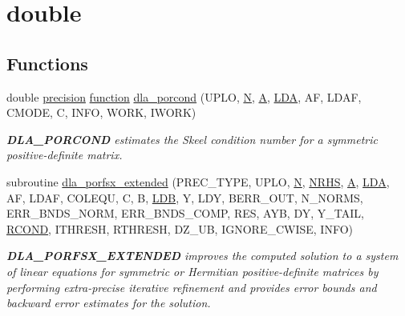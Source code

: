 \hypertarget{group__doublePOcomputational}{}\section{double}
\label{group__doublePOcomputational}
\subsection*{Functions}
\begin{DoxyCompactItemize}
\item 
double \hyperlink{numinquire_8h_a2c8e616467665d0b2814d4c1589ba74e}{precision} \hyperlink{afunc_8m_a7b5e596df91eadea6c537c0825e894a7}{function} \hyperlink{group__doublePOcomputational_gaea66202c968583fe8b93e6259b86f7ac}{dla\+\_\+porcond} (U\+P\+L\+O, \hyperlink{polmisc_8c_a0240ac851181b84ac374872dc5434ee4}{N}, \hyperlink{classA}{A}, \hyperlink{example__user_8c_ae946da542ce0db94dced19b2ecefd1aa}{L\+D\+A}, A\+F, L\+D\+A\+F, C\+M\+O\+D\+E, C, I\+N\+F\+O, W\+O\+R\+K, I\+W\+O\+R\+K)
\begin{DoxyCompactList}\small\item\em {\bfseries D\+L\+A\+\_\+\+P\+O\+R\+C\+O\+N\+D} estimates the Skeel condition number for a symmetric positive-\/definite matrix. \end{DoxyCompactList}\item 
subroutine \hyperlink{group__doublePOcomputational_ga1f04f8900d0a841afb32c0b60535ff7b}{dla\+\_\+porfsx\+\_\+extended} (P\+R\+E\+C\+\_\+\+T\+Y\+P\+E, U\+P\+L\+O, \hyperlink{polmisc_8c_a0240ac851181b84ac374872dc5434ee4}{N}, \hyperlink{example__user_8c_aa0138da002ce2a90360df2f521eb3198}{N\+R\+H\+S}, \hyperlink{classA}{A}, \hyperlink{example__user_8c_ae946da542ce0db94dced19b2ecefd1aa}{L\+D\+A}, A\+F, L\+D\+A\+F, C\+O\+L\+E\+Q\+U, C, B, \hyperlink{example__user_8c_a50e90a7104df172b5a89a06c47fcca04}{L\+D\+B}, Y, L\+D\+Y, B\+E\+R\+R\+\_\+\+O\+U\+T, N\+\_\+\+N\+O\+R\+M\+S, E\+R\+R\+\_\+\+B\+N\+D\+S\+\_\+\+N\+O\+R\+M, E\+R\+R\+\_\+\+B\+N\+D\+S\+\_\+\+C\+O\+M\+P, R\+E\+S, A\+Y\+B, D\+Y, Y\+\_\+\+T\+A\+I\+L, \hyperlink{superlu__enum__consts_8h_af00a42ecad444bbda75cde1b64bd7e72a9b5c151728d8512307565994c89919d5}{R\+C\+O\+N\+D}, I\+T\+H\+R\+E\+S\+H, R\+T\+H\+R\+E\+S\+H, D\+Z\+\_\+\+U\+B, I\+G\+N\+O\+R\+E\+\_\+\+C\+W\+I\+S\+E, I\+N\+F\+O)
\begin{DoxyCompactList}\small\item\em {\bfseries D\+L\+A\+\_\+\+P\+O\+R\+F\+S\+X\+\_\+\+E\+X\+T\+E\+N\+D\+E\+D} improves the computed solution to a system of linear equations for symmetric or Hermitian positive-\/definite matrices by performing extra-\/precise iterative refinement and provides error bounds and backward error estimates for the solution. \end{DoxyCompactList}\item 

\end{DoxyCompactItemize}
